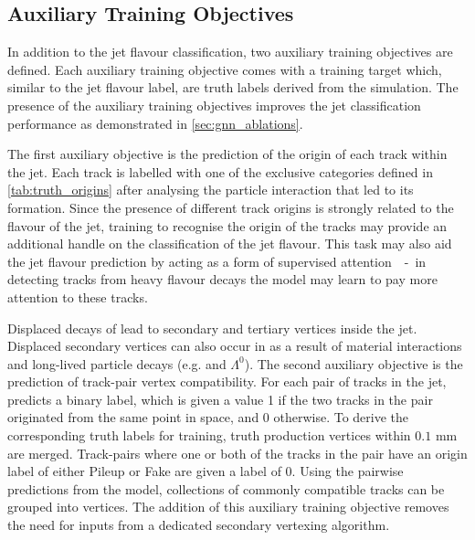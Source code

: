 \subsection{Auxiliary Training Objectives}\label{sec:aux-train-objectives}

In addition to the jet flavour classification, two auxiliary training objectives are defined.
Each auxiliary training objective comes with a training target which, similar to the jet flavour label, are truth labels derived from the simulation.
The presence of the auxiliary training objectives improves the jet classification performance as demonstrated in \cref{sec:gnn_ablations}.

The first auxiliary objective is the prediction of the origin of each track within the jet. 
Each track is labelled with one of the exclusive categories defined in \cref{tab:truth_origins} after analysing the particle interaction that led to its formation. 
Since the presence of different track origins is strongly related to the flavour of the jet, training \GNN to recognise the origin of the tracks may provide an additional handle on the classification of the jet flavour.
This task may also aid the jet flavour prediction by acting as a form of supervised attention~\cite{arxiv.2007.08294}~-~in detecting tracks from heavy flavour decays the model may learn to pay more attention to these tracks.

Displaced decays of \bchadrons lead to secondary and tertiary vertices inside the jet.
Displaced secondary vertices can also occur in \ljets as a result of material interactions and long-lived particle decays (e.g. \Kshort and $\Lambda^0$).
The second auxiliary objective is the prediction of track-pair vertex compatibility. 
For each pair of tracks in the jet, \GNN predicts a binary label, which is given a value 1 if the two tracks in the pair originated from the same point in space, and 0 otherwise. 
To derive the corresponding truth labels for training, truth production vertices within $0.1$ mm are merged.
Track-pairs where one or both of the tracks in the pair have an origin label of either Pileup or Fake are given a label of 0.
Using the pairwise predictions from the model, collections of commonly compatible tracks can be grouped into vertices.
The addition of this auxiliary training objective removes the need for inputs from a dedicated secondary vertexing algorithm.

